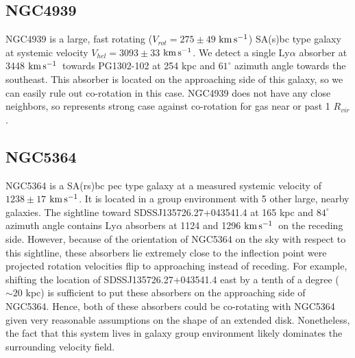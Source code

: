 \documentclass[iop]{emulateapj-rtx4}
\newcommand{\kms}{$\rm km\, s^{-1}$}
\begin{document}
%



\subsection{NGC4939}
NGC4939 is a large, fast rotating ($V_{rot} = 275 \pm 49$ \kms) SA(s)bc type galaxy at systemic velocity $V_{hel} = 3093 \pm 33$ \kms. We detect a single Ly$\alpha$ absorber at 3448 \kms~towards PG1302-102 at 254 kpc and $61^{\circ}$ azimuth angle towards the southeast. This absorber is located on the approaching side of this galaxy, so we can easily rule out co-rotation in this case. NGC4939 does not have any close neighbors, so represents strong case against co-rotation for gas near or past 1 $R_{vir}$.





\subsection{NGC5364}
NGC5364 is a SA(rs)bc pec type galaxy at a measured systemic velocity of $1238 \pm 17$ \kms. It is located in a group environment with 5 other large, nearby galaxies. The sightline toward SDSSJ135726.27+043541.4 at 165 kpc and $84^{\circ}$ azimuth angle contains Ly$\alpha$ absorbers at 1124 and 1296 \kms~on the receding side. However, because of the orientation of NGC5364 on the sky with respect to this sightline, these absorbers lie extremely close to the inflection point were projected rotation velocities flip to approaching instead of receding. For example, shifting the location of SDSSJ135726.27+043541.4 east by a tenth of a degree ($\sim 20$ kpc) is sufficient to put these absorbers on the approaching side of NGC5364. Hence, both of these absorbers could be co-rotating with NGC5364 given very reasonable assumptions on the shape of an extended disk. Nonetheless, the fact that this system lives in galaxy group environment likely dominates the surrounding velocity field.
\end{document}
